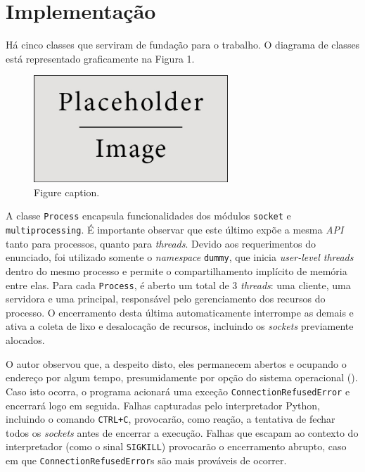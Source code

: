\documentclass[a4paper,12pt]{article}
\begin{document}
        
        \section{Implementação}
        
        Há cinco classes que serviram de fundação para o trabalho.
        O diagrama de classes está representado graficamente na Figura 1.

        \begin{figure}[h]
            \begin{center}
                \includegraphics[width=0.65\textwidth]{placeholder_1} %
                \caption{Figure caption.}
            \end{center}
        \end{figure}

        A classe \texttt{Process} encapsula funcionalidades dos módulos \texttt{socket} \cite{WEBSITE:7} e \texttt{multiprocessing}.
        É importante observar que este último expõe a mesma \emph{API} tanto para processos, quanto para \emph{threads}.
        Devido aos requerimentos do enunciado, foi utilizado somente o \emph{namespace} \texttt{dummy}, que inicia \emph{user-level threads} dentro do mesmo processo e permite o compartilhamento implícito de memória entre elas.
        Para cada \texttt{Process}, é aberto um total de 3 \emph{threads}: uma cliente, uma servidora e uma principal, responsável pelo gerenciamento dos recursos do processo.
        O encerramento desta última automaticamente interrompe as demais e ativa a coleta de lixo e desalocação de recursos, incluindo os \emph{sockets} previamente alocados.
        
        O autor observou que, a despeito disto, eles permanecem abertos e ocupando o endereço por algum tempo, presumidamente por opção do sistema operacional (\cite{WEBSITE:7}).
        Caso isto ocorra, o programa acionará uma exceção \texttt{ConnectionRefusedError} e encerrará logo em seguida.
        Falhas capturadas pelo interpretador Python, incluindo o comando \texttt{CTRL+C}, provocarão, como reação, a tentativa de fechar todos os \emph{sockets} antes de encerrar a execução.
        Falhas que escapam ao contexto do interpretador (como o sinal \texttt{SIGKILL}) provocarão o encerramento abrupto, caso em que \texttt{ConnectionRefusedError}s são mais prováveis de ocorrer. 
\end{document}
